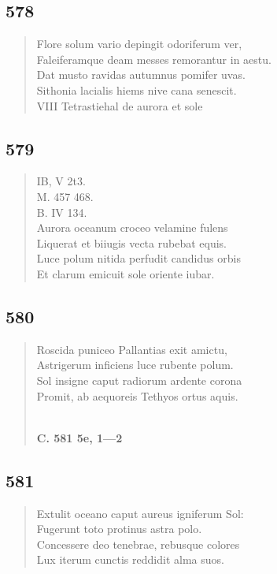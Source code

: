\documentclass[11pt, a4paper]{report}
\begin{document}
            \subsection*{578}
      \begin{verse}
      Flore solum vario depingit odoriferum ver, \\ Faleiferamque deam messes remorantur in aestu. \\ Dat musto ravidas autumnus pomifer uvas. \\ Sithonia lacialis hiems nive cana senescit. \\ VIII  \lbrack Tetrastiehal de aurora et sole \\ 
      \end{verse}
  
            \subsection*{579}
      \begin{verse}
      IB, V 2t3. \\ M. 457 468. \\ B. IV 134. \\ Aurora oceanum croceo velamine fulens \\ Liquerat et biiugis vecta rubebat equis. \\ Luce polum nitida perfudit candidus orbis \\ Et clarum emicuit sole oriente iubar. \\ 
      \end{verse}
  
            \subsection*{580}
      \begin{verse}
      Roscida puniceo Pallantias exit amictu, \\ Astrigerum inficiens luce rubente polum. \\ Sol insigne caput radiorum ardente corona \\ Promit, ab aequoreis Tethyos ortus aquis. \\ 
        ﻿\pagebreak 
     \marginpar{[80]} \begin{center} \textbf{C. 581 5e, 1—2} \end{center}
      \end{verse}
  
            \subsection*{581}
      \begin{verse}
      Extulit oceano caput aureus igniferum Sol: \\ Fugerunt toto protinus astra polo. \\ Concessere deo tenebrae, rebusque colores \\ Lux iterum cunctis reddidit alma suos. \\ 
      \end{verse}
  
\end{document}
